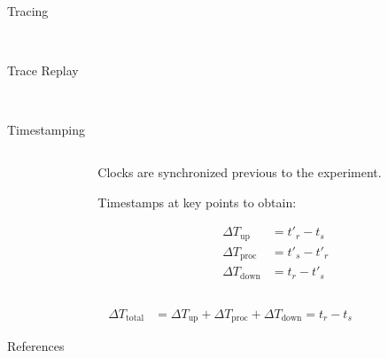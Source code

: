 \documentclass[aspectratio=1610]{beamer}
\begin{document}
\begin{frame}{Tracing}
    \begin{center}
        \\
    \end{center}
\end{frame}

\begin{frame}{Trace Replay}
    \begin{center}
        \\
    \end{center}
\end{frame}

\begin{frame}{Timestamping}
    \begin{columns}[onlytextwidth]
        \begin{column}{.5\linewidth}
            \footnotesize%
            \raggedright%
            
        \end{column}%
        \begin{column}{.5\linewidth}
            Clocks are synchronized previous to the experiment.

            \vspace{\baselineskip}%
            Timestamps at key points to obtain:

            \begin{align}
                {\Delta}T_\text{up}   & = t'_{r} - t_{s}  \\
                {\Delta}T_\text{proc} & = t'_{s} - t'_{r} \\
                {\Delta}T_\text{down} & = t_{r} - t'_{s}
            \end{align}
        \end{column}%
    \end{columns}
    \begin{align}
        {\Delta}T_\text{total} & = {\Delta}T_\text{up} + {\Delta}T_\text{proc} + {\Delta}T_\text{down} = t_{r} - t_{s}
    \end{align}
\end{frame}

\begin{frame}[allowframebreaks, t]{References}
    \nocite{*}
    \printbibliography%
\end{frame}
\end{document}
